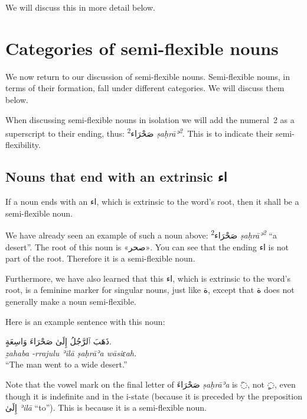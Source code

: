 \documentclass[
  10pt,
]{book}
\begin{document}
We will discuss this in more detail below.

\section{Categories of semi-flexible nouns}\label{categories-of-semi-flexible-nouns}

We now return to our discussion of semi-flexible nouns. Semi-flexible nouns, in terms of their formation, fall under different categories. We will discuss them below.

When discussing semi-flexible nouns in isolation we will add the numeral~2 as a superscript to their ending, thus:
\foreignlanguage{arabic}{صَحْرَاء\textsuperscript{2}} \emph{ṣaḥrāʾ\textsuperscript{2}}. This is to indicate their semi-flexibility.

\subsection{\texorpdfstring{Nouns that end with an extrinsic \foreignlanguage{arabic}{اء}}{Nouns that end with an extrinsic اء}}\label{nouns-that-end-with-an-extrinsic-ux627ux621}

If a noun ends with an \foreignlanguage{arabic}{اء}, which is extrinsic to the word's root, then it shall be a semi-flexible noun.

We have already seen an example of such a noun above: \foreignlanguage{arabic}{صَحْرَاء\textsuperscript{2}} \emph{ṣaḥrāʾ\textsuperscript{2}} \enquote{a desert}. The root of this noun is \foreignlanguage{arabic}{«صحر»}. You can see that the ending \foreignlanguage{arabic}{اء} is not part of the root. Therefore it is a semi-flexible noun.

Furthermore, we have also learned that this \foreignlanguage{arabic}{اء}, which is extrinsic to the word's root, is a feminine marker for singular nouns, just like \foreignlanguage{arabic}{ة}, except that \foreignlanguage{arabic}{ة} does not generally make a noun semi-flexible.

Here is an example sentence with this noun:

\foreignlanguage{arabic}{ذَهَبَ ٱلرَّجُلُ إِلَىٰ صَحْرَاءَ وَاسِعَةٍ.}\\
\emph{ẕahaba -rrajulu ʾilā ṣaḥrāʾa wāsiɛah.}\\
\enquote{The man went to a wide desert.}

Note that the vowel mark on the final letter of \foreignlanguage{arabic}{صَحْرَاءَ} \emph{ṣaḥrāʾa} is \foreignlanguage{arabic}{◌َ}, not \foreignlanguage{arabic}{◌ٍ}, even though it is indefinite and in the i-state (because it is preceded by the preposition \foreignlanguage{arabic}{إِلَىٰ} \emph{ʾilā} \enquote{to}). This is because it is a semi-flexible noun.
\end{document}
